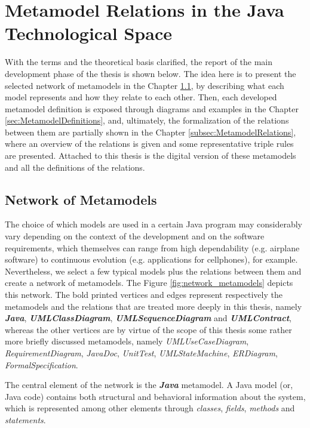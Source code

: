 \documentclass[tuberlin,cic,tc,english,noabntcite,oneside]{iiufrgs}
\begin{document}
\chapter{Metamodel Relations in the Java Technological Space}
\label{chapter:metamodel_relations}
With the terms and the theoretical basis clarified, the report of the main development phase of the thesis is shown below. The idea here is to present the selected network of metamodels in the Chapter \ref{sec:NetworkMetamodels}, by describing what each model represents and how they relate to each other. Then, each developed metamodel definition is exposed through diagrams and examples in the Chapter \ref{sec:MetamodelDefinitions}, and, ultimately, the formalization of the relations between them are partially shown in the Chapter \ref{subsec:MetamodelRelations}, where an overview of the relations is given and some representative triple rules are presented. Attached to this thesis is the digital version of these metamodels and all the definitions of the relations.

\section{Network of Metamodels}
\label{sec:NetworkMetamodels}
The choice of which models are used in a certain Java program may considerably vary depending on the context of the development and on the software requirements, which themselves can range from high dependability (e.g. airplane software) to continuous evolution (e.g. applications for cellphones), for example. Nevertheless, we select a few typical models plus the relations between them and create a network of metamodels. The Figure \ref{fig:network_metamodels} depicts this network. The bold printed vertices and edges represent respectively the metamodels and the relations that are treated more deeply in this thesis, namely \textbf{\emph{Java}}, \textbf{\emph{UMLClassDiagram}}, \textbf{\emph{UMLSequenceDiagram}} and \textbf{\emph{UMLContract}}, whereas the other vertices are by virtue of the scope of this thesis some rather more briefly discussed metamodels, namely \emph{UMLUseCaseDiagram}, \emph{RequirementDiagram}, \emph{JavaDoc}, \emph{UnitTest}, \emph{UMLStateMachine}, \emph{ERDiagram}, \emph{FormalSpecification}.

The central element of the network is the \textbf{\emph{Java}} metamodel. A Java model (or, Java code) contains both structural and behavioral information about the system, which is represented among other elements through \emph{classes}, \emph{fields}, \emph{methods} and \emph{statements}.
\end{document}
